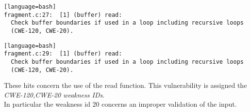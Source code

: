 \documentclass[a4paper,12pt]{article}
\begin{document}
\begin{lstlisting}[style=DOS][language=bash]
fragment.c:27:  [1] (buffer) read:
  Check buffer boundaries if used in a loop including recursive loops
  (CWE-120, CWE-20).
\end{lstlisting}

\begin{lstlisting}[style=DOS][language=bash]
fragment.c:29:  [1] (buffer) read:
  Check buffer boundaries if used in a loop including recursive loops
  (CWE-120, CWE-20).

\end{lstlisting}
These hits concern the use of the read function.
This vulnerability is assigned the \textit{CWE-120,CWE-20 weakness IDs}.\\
In particular the weakness id 20 concerns an improper validation of the input.\cite{CWE}
\end{document}
